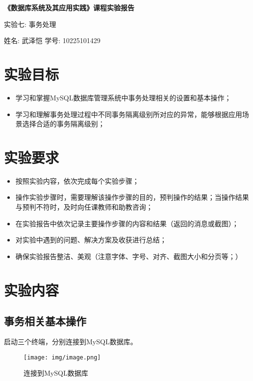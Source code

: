 \documentclass{article}
\begin{document}
\begin{center}
    \textbf{\LARGE{《数据库系统及其应用实践》课程实验报告}}

    \large{实验七: 事务处理 }

    \large{姓名: 武泽恺 \quad 学号: 10225101429}

\end{center}

\section{实验目标}
\begin{itemize}
    \item 学习和掌握MySQL数据库管理系统中事务处理相关的设置和基本操作；
    \item 学习和理解事务处理过程中不同事务隔离级别所对应的异常，能够根据应用场景选择合适的事务隔离级别；
\end{itemize}

\section{实验要求}

\begin{itemize}
    \item 按照实验内容，依次完成每个实验步骤；
    \item 操作实验步骤时，需要理解该操作步骤的目的，预判操作的结果；当操作结果与预判不符时，及时向任课教师和助教咨询；
    \item 在实验报告中依次记录主要操作步骤的内容和结果（返回的消息或截图）；
    \item 对实验中遇到的问题、解决方案及收获进行总结；
    \item 确保实验报告整洁、美观（注意字体、字号、对齐、截图大小和分页等；）
\end{itemize}

\section{实验内容}

\subsection{事务相关基本操作}

启动三个终端，分别连接到MySQL数据库。

\begin{figure}[H]
    \centering
    \texttt{[image: img/image.png]}
    \caption{连接到MySQL数据库}
\end{figure}
\end{document}
